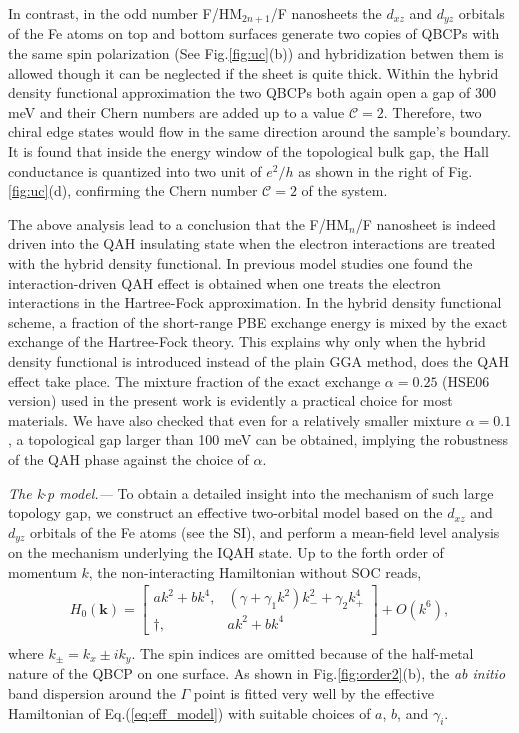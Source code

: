 \documentclass[twocolumn,english,prb,showpacs]{revtex4-1}
\begin{document}
In contrast, in the odd number F/HM$_{2n+1}$/F nanosheets the $d_{xz}$ and $d_{yz}$ orbitals of the Fe atoms on top and bottom surfaces generate two copies of QBCPs with the same spin polarization (See Fig.\ref{fig:uc}(b)) and hybridization betwen them is allowed though it can be neglected if the sheet is quite thick. Within the hybrid density functional approximation the two QBCPs both again open a gap of 300 meV and their Chern numbers are added up to a value $\mathcal{C}=2$. Therefore, two chiral edge states would flow in the same direction around the sample's boundary. It is found that inside the energy window of the topological bulk gap, the Hall conductance is quantized into two unit of ${e^2}/{h}$ as shown in the right of Fig.\ref{fig:uc}(d), confirming the Chern number $\mathcal{C}=2$ of the system.

The above analysis lead to a conclusion that the F/HM$_n$/F nanosheet is indeed driven into the QAH insulating state when the electron interactions are treated with the hybrid density functional. In previous model studies one found the interaction-driven QAH effect is obtained when one treats the electron interactions in the Hartree-Fock approximation. In the hybrid density functional scheme, a fraction of the short-range PBE exchange energy is mixed by the exact exchange of the Hartree-Fock theory\cite{Kummel08RMP}. This explains why only when the hybrid density functional is introduced instead of the plain GGA method, does the QAH effect take place. The mixture fraction of the exact exchange $\alpha=0.25$ (HSE06 version) used in the present work is evidently a practical choice for most materials. We have also checked that even for a relatively smaller mixture $\alpha=0.1$, a topological gap larger than 100 meV can be obtained, implying the robustness of the QAH phase against the choice of $\alpha$.


\vspace{3mm}
\noindent\textit{The k$\cdot$p model.---}
To obtain a detailed insight into the mechanism of such large topology gap, we construct an effective two-orbital model based on the $d_{xz}$ and $d_{yz}$ orbitals of the Fe atoms (see the SI), and perform a mean-field level analysis on the mechanism underlying the IQAH state. Up to the forth order of momentum $k$, the non-interacting Hamiltonian without SOC reads,
  \begin{eqnarray}
  H_0(\bm{k})=\left[\begin{array}{cc}
                ak^2+bk^4, & (\gamma+\gamma_1k^2) k_{-}^2+\gamma_2 k_{+}^4\\
                \dag, & ak^2+bk^4
              \end{array}\right]+O(k^6),\nonumber\\
              \label{eq:eff_model}
  \end{eqnarray} where $k_{\pm}=k_x\pm i k_y$. The spin indices are omitted because of the half-metal nature of the QBCP on one surface. As shown in Fig.\ref{fig:order2}(b), the \textit{ab initio} band dispersion around the $\Gamma$ point is fitted very well by the effective Hamiltonian of Eq.(\ref{eq:eff_model}) with suitable choices of $a$, $b$, and $\gamma_i$.
\end{document}

